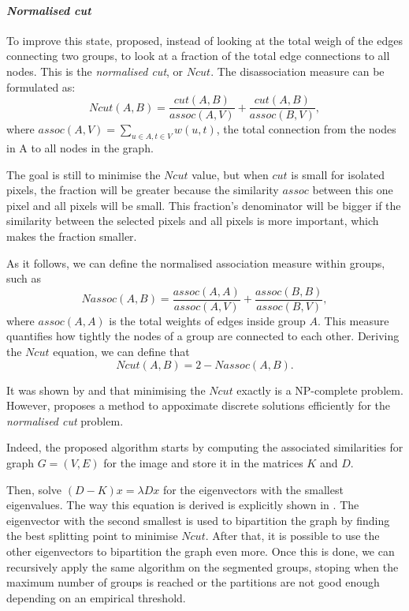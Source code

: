 \paragraph{\textit{Normalised cut}}

To improve this state, \cite{shi_normalized_2000} proposed, instead of looking at the total weigh of the edges connecting two groups, to look at a fraction of the total edge connections to all nodes.
This is the \textit{normalised cut}, or \(Ncut\).
The disassociation measure can be formulated as:
\[Ncut(A, B) = \frac{cut(A, B)}{assoc(A, V)} + \frac{cut(A, B)}{assoc(B, V)},\]
where \(assoc(A, V) = \sum_{u\in A, t\in V} w(u, t)\), the total connection from the nodes in A to all nodes in the graph.

The goal is still to minimise the \(Ncut\) value, but when \(cut\) is small for isolated pixels, the fraction will be greater because the similarity \(assoc\) between this one pixel and all pixels will be small.
This fraction's denominator will be bigger if the similarity between the selected pixels and all pixels is more important, which makes the fraction smaller.

As it follows, we can define the normalised association measure within groups, such as
\[Nassoc(A, B) = \frac{assoc(A, A)}{assoc(A,V)} + \frac{assoc(B, B)}{assoc(B, V)},\]
where \(assoc(A, A)\) is the total weights of edges inside group \(A\).
This measure quantifies how tightly the nodes of a group are connected to each other.
Deriving the \(Ncut\) equation, we can define that
\[Ncut(A, B) = 2 - Nassoc(A, B).\]

It was shown by \cite{papadimitriou_npcompleteness_1997} and \cite{shi_normalized_2000} that minimising the \(Ncut\) exactly is a NP-complete problem.
However, \cite{shi_normalized_2000} proposes a method to appoximate discrete solutions efficiently for the \textit{normalised cut} problem.

Indeed, the proposed algorithm starts by computing the associated similarities for graph \(G = (V, E)\) for the image and store it in the matrices \(K\) and \(D\).

Then, solve \((D-K)x = \lambda Dx\) for the eigenvectors with the smallest eigenvalues.
The way this equation is derived is explicitly shown in \cite{shi_normalized_2000}.
The eigenvector with the second smallest is used to bipartition the graph by finding the best splitting point to minimise \(Ncut\).
After that, it is possible to use the other eigenvectors to bipartition the graph even more.
Once this is done, we can recursively apply the same algorithm on the segmented groups, stoping when the maximum number of groups is reached or the partitions are not good enough depending on an empirical threshold.

